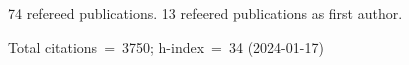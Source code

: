 74 refereed publications. 13 refeered publications as first author.

Total citations~=~3750; h-index~=~34 (2024-01-17)